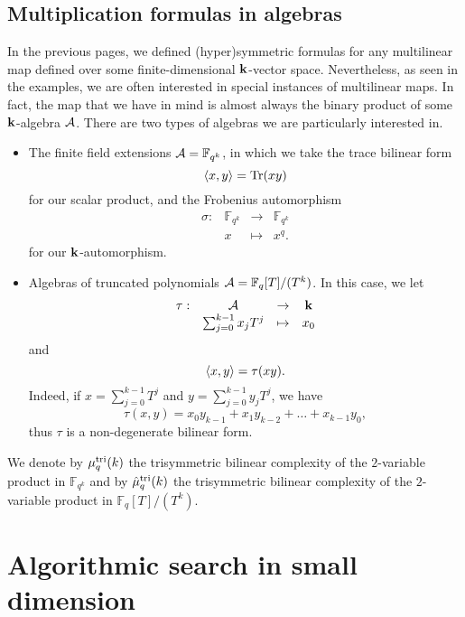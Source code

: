 \subsection{Multiplication formulas in algebras}
\label{sec:formulas-algebras}

In the previous pages, we defined (hyper)symmetric formulas for any
multilinear map defined over some finite-dimensional $\mathbf{k}$-vector space.
Nevertheless, as seen in the examples, we are often interested in special
instances of multilinear maps. In fact, the map that we have in mind is almost
always the binary product of some $\mathbf{k}$-algebra $\mathcal{A}$. There are
two types of algebras we are particularly interested in.
\begin{itemize}
  \item The finite field extensions $\mathcal{A}=\mathbb{F}_{q^k}$, in which we take the
    trace bilinear form
    \[
      \left\langle x,y\right\rangle=\operatorname{Tr}(xy)
    \]
    for our scalar product, and the Frobenius automorphism
    \[
  \begin{array}{cccc}
    \sigma: & \mathbb{F}_{q^k} & \to & \mathbb{F}_{q^k} \\
    & x & \mapsto & x^q.
  \end{array}
\]
for our $\mathbf{k}$-automorphism.
\item Algebras of truncated polynomials $\mathcal{A} = \mathbb{F}_q[T]/(T^k)$. In this
  case, we let 
  \[
  \begin{array}{cccc}
    \tau: & \mathcal{A} & \to & \mathbf{k} \\
    & \sum_{j=0}^{k-1}x_j T^j & \mapsto & x_0
  \end{array}
\]
and
\[
  \left\langle x,y\right\rangle = \tau(xy).
\]
Indeed, if $x=\sum_{j=0}^{k-1}T^j$ and $y=\sum_{j=0}^{k-1}y_jT^j$, we have
\[
  \tau(x, y) = x_0y_{k-1} + x_1y_{k-2} + \dots + x_{k-1}y_0,
\]
thus $\tau$ is a non-degenerate bilinear form.
\end{itemize}
We denote by $\mu^{\textrm{tri}}_q(k)$ the trisymmetric bilinear complexity of the
$2$-variable product in $\mathbb{F}_{q^k}$ and by $\hat\mu^{\textrm{tri}}_q(k)$ the
trisymmetric bilinear complexity of the $2$-variable product in
$\mathbb{F}_q[T]/(T^k)$.

\section{Algorithmic search in small dimension}
\label{sec:algo-small-dim}

